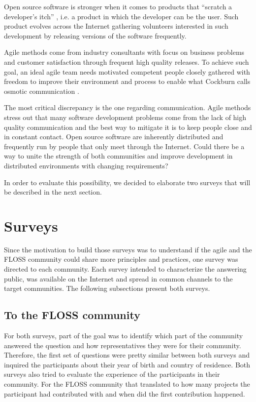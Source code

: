 \documentclass[lnbip]{svmultln}
\begin{document}
Open source software is stronger when it comes to products that
``scratch a developer's itch'' \cite{fitzgerald2000}, i.e. a product
in which the developer can be the user. Such product evolves across
the Internet gathering volunteers interested in such development by
releasing versions of the software frequently.

Agile methods come from industry consultants with focus on business
problems and customer satisfaction through frequent high quality
releases. To achieve such goal, an ideal agile team needs motivated
competent people closely gathered with freedom to improve their
environment and process to enable what Cockburn calls osmotic
communication \cite{cockburn2004}.

The most critical discrepancy is the one regarding
communication. Agile methods stress out that many software development
problems come from the lack of high quality communication and the best
way to mitigate it is to keep people close and in constant
contact. Open source software are inherently distributed and
frequently run by people that only meet through the Internet. Could
there be a way to unite the strength of both communities and improve
development in distributed environments with changing requirements?

In order to evaluate this possibility, we decided to elaborate two
surveys that will be described in the next section.

\section{Surveys}
\label{sec:surveys}

Since the motivation to build those surveys was to understand if the
agile and the FLOSS community could share more principles and
practices, one survey was directed to each community.  Each survey
intended to characterize the answering public, was available on the
Internet and spread in common channels to the target communities. The
following subsections present both surveys.

\subsection{To the FLOSS community}
\label{subsec:floss-survey}

For both surveys, part of the goal was to identify which part of the
community answered the question and how representatives they were for
their community. Therefore, the first set of questions were pretty
similar between both surveys and inquired the participants about their
year of birth and country of residence. Both surveys also tried to
evaluate the experience of the participants in their community. For
the FLOSS community that translated to how many projects the
participant had contributed with and when did the first contribution
happened.
\end{document}

